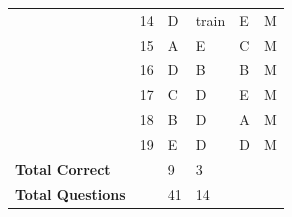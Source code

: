 \documentclass[pageno]{jpaper}
\begin{document}
\begin{table}[]
\begin{tabular}{@{}llllll@{}}
\textbf{}               & 14                                  & D                                          & train                                       & E                                           & M                                       \\
\textbf{}               & 15                                  & A                                          & E                                           & C                                           & M                                       \\
\textbf{}               & 16                                  & D                                          & B                                           & B                                           & M                                       \\
\textbf{}               & 17                                  & C                                          & D                                           & E                                           & M                                       \\
\textbf{}               & 18                                  & B                                          & D                                           & A                                           & M                                       \\
\textbf{}               & 19                                  & E                                          & D                                           & D                                           & M                                       \\ \midrule
\textbf{Total Correct}  &                                     & 9                                          & 3                                           &                                             &                                         \\
\textbf{Total Questions} &                                     & 41                                         & 14                                          &                                             &                                         \\ \bottomrule
\end{tabular}
\end{table}
\end{document}
